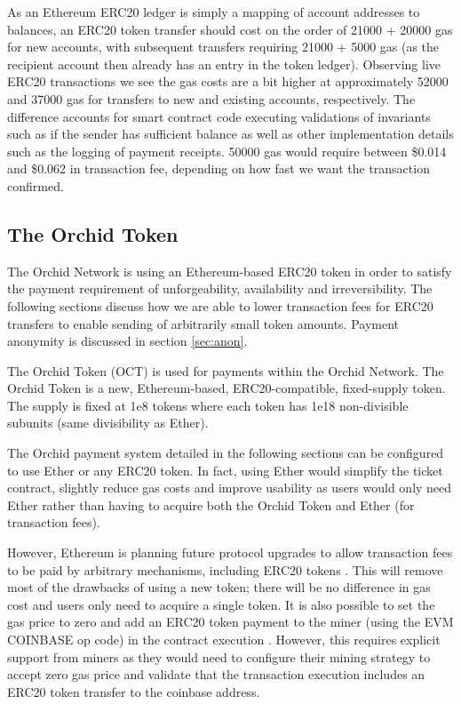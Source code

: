 As an Ethereum ERC20 ledger is simply a mapping of account addresses to balances, an ERC20 token transfer should cost on the order of 21000 + 20000 gas for new accounts, with subsequent transfers requiring 21000 + 5000 gas (as the recipient account then already has an entry in the token ledger). Observing live\cite{LiveERC20} ERC20 transactions we see the gas costs are a bit higher at approximately 52000 and 37000 gas for transfers to new and existing accounts, respectively. The difference accounts for smart contract code executing validations of invariants such as if the sender has sufficient balance as well as other implementation details such as the logging of payment receipts. 50000 gas would require between \$0.014 and \$0.062 in transaction fee, depending on how fast we want the transaction confirmed.

\subsection{The Orchid Token}
\label{sec:oct}

The Orchid Network is using an Ethereum-based ERC20 token in order to satisfy the payment requirement of unforgeability, availability and irreversibility. The following sections discuss how we are able to lower transaction fees for ERC20 transfers to enable sending of arbitrarily small token amounts. Payment anonymity is discussed in section \ref{sec:anon}.

The Orchid Token (OCT) is used for payments within the Orchid Network. The Orchid Token is a new, Ethereum-based, ERC20-compatible, fixed-supply token. The supply is fixed at 1e8 tokens where each token has 1e18 non-divisible subunits (same divisibility as Ether).

The Orchid payment system detailed in the following sections can be configured to use Ether or any ERC20 token. In fact, using Ether would simplify the ticket contract, slightly reduce gas costs and improve usability as users would only need Ether rather than having to acquire both the Orchid Token and Ether (for transaction fees).

However, Ethereum is planning future protocol upgrades to allow transaction fees to be paid by arbitrary mechanisms, including ERC20 tokens \cite{ETHAbstractions} \cite{ETHSerenity}. This will remove most of the drawbacks of using a new token; there will be no difference in gas cost and users only need to acquire a single token. It is also possible to set the gas price to zero and add an ERC20 token payment to the miner (using the EVM COINBASE\cite{ETHSpec} op code) in the contract execution \cite{ETHTokenFees}. However, this requires explicit support from miners as they would need to configure their mining strategy to accept zero gas price and validate that the transaction execution includes an ERC20 token transfer to the coinbase address.

